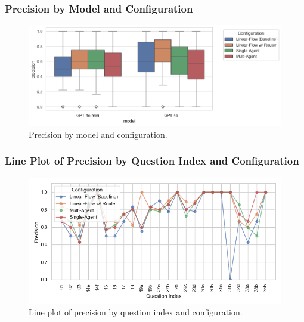             \subsubsection{Precision by Model and Configuration}
            \begin{figure}[H]
                \centering
                \includegraphics[scale=0.75]{images_exp2/precision/precision_by_model_and_configuration.png}
                \caption{Precision by model and configuration.}
                \label{fig:precision_by_model_and_configuration}
            \end{figure}

            \subsubsection{Line Plot of Precision by Question Index and Configuration}
            \begin{figure}[H]
                \centering
                \includegraphics[width=\textwidth]{images_exp2/precision/precision_lineplot_by_question_index_and_configuration.png}
                \caption{Line plot of precision by question index and configuration.}
                \label{fig:precision_lineplot_by_question_index_and_configuration}
            \end{figure}

